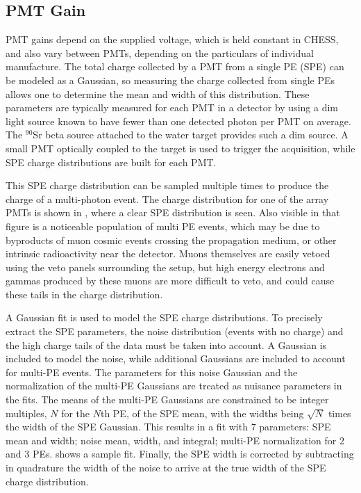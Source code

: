 \subsection{PMT Gain}
\label{pmt-gain}
PMT gains depend on the supplied voltage, which is held constant in CHESS, and also vary between PMTs, depending on the particulars of individual manufacture.
The total charge collected by a PMT from a single PE (SPE) can be modeled as a Gaussian, so measuring the charge collected from single PEs allows one to determine the mean and width of this distribution. 
These parameters are typically measured for each PMT in a detector by using a dim light source known to have fewer than one detected photon per PMT on average.
The $^{90}$Sr beta source attached to the water target provides such a dim source.
A small PMT optically coupled to the target is used to trigger the acquisition, while SPE charge distributions are built for each PMT.

This SPE charge distribution can be sampled multiple times to produce the charge of a multi-photon event.
The charge distribution for one of the array PMTs is shown in , where a clear SPE distribution is seen. 
Also visible in that figure is a noticeable population of multi PE events, which may be due to byproducts of muon cosmic events crossing the propagation medium, or other intrinsic radioactivity near the detector. 
Muons themselves are easily vetoed using the veto panels surrounding the setup, but high energy electrons and gammas produced by these muons are more difficult to veto, and could cause these tails in the charge distribution. 

A Gaussian fit is used to model the SPE charge distributions. 
To precisely extract the SPE parameters, the noise distribution (events with no charge) and the high charge tails of the data must be taken into account.
A Gaussian is included to model the noise, while additional Gaussians are included to account for multi-PE events. 
The parameters for this noise Gaussian and the normalization of the multi-PE Gaussians are treated as nuisance parameters in the fits.
The means of the multi-PE Gaussians are constrained to be integer multiples, $N$ for the $N$th PE, of the SPE mean, with the widths being $\sqrt{N}$ times the width of the SPE Gaussian.
This results in a fit with 7 parameters: SPE mean and width; noise mean, width, and integral; multi-PE normalization for 2 and 3 PEs.
 shows a sample fit.
Finally, the SPE width is corrected by subtracting in quadrature the width of the noise to arrive at the true width of the SPE charge distribution.


